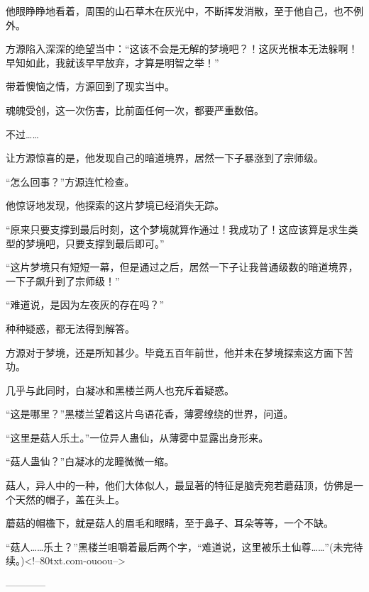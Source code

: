 \begin{this_body}
他眼睁睁地看着，周围的山石草木在灰光中，不断挥发消散，至于他自己，也不例外。

方源陷入深深的绝望当中：“这该不会是无解的梦境吧？！这灰光根本无法躲啊！早知如此，我就该早早放弃，才算是明智之举！”

带着懊恼之情，方源回到了现实当中。

魂魄受创，这一次伤害，比前面任何一次，都要严重数倍。

不过……

让方源惊喜的是，他发现自己的暗道境界，居然一下子暴涨到了宗师级。

“怎么回事？”方源连忙检查。

他惊讶地发现，他探索的这片梦境已经消失无踪。

“原来只要支撑到最后时刻，这个梦境就算作通过！我成功了！这应该算是求生类型的梦境吧，只要支撑到最后即可。”

“这片梦境只有短短一幕，但是通过之后，居然一下子让我普通级数的暗道境界，一下子飙升到了宗师级！”

“难道说，是因为左夜灰的存在吗？”

种种疑惑，都无法得到解答。

方源对于梦境，还是所知甚少。毕竟五百年前世，他并未在梦境探索这方面下苦功。

几乎与此同时，白凝冰和黑楼兰两人也充斥着疑惑。

“这是哪里？”黑楼兰望着这片鸟语花香，薄雾缭绕的世界，问道。

“这里是菇人乐土。”一位异人蛊仙，从薄雾中显露出身形来。

“菇人蛊仙？”白凝冰的龙瞳微微一缩。

菇人，异人中的一种，他们大体似人，最显著的特征是脑壳宛若蘑菇顶，仿佛是一个天然的帽子，盖在头上。

蘑菇的帽檐下，就是菇人的眉毛和眼睛，至于鼻子、耳朵等等，一个不缺。

“菇人……乐土？”黑楼兰咀嚼着最后两个字，“难道说，这里被乐土仙尊……”(未完待续。)<!--80txt.com-ouoou-->

------------

\end{this_body}

